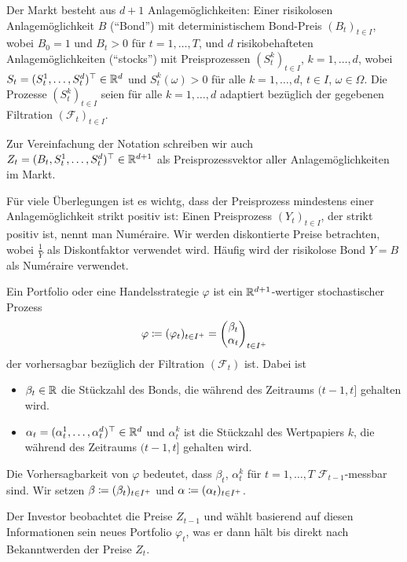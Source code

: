 \documentclass[a4paper,twoside,DIV15,BCOR12mm]{scrbook}
\newcommand{\cF}{\mathcal F}
\begin{document}
Der Markt besteht aus $d+1$ Anlagemöglichkeiten: Einer risikolosen Anlagemöglichkeit $B$ (“Bond”) mit deterministischem Bond-Preis $(B_t)_{t\in I}$, wobei $B_0=1$ und $B_t>0$ für $t=1,\ldots,T$, und $d$ risikobehafteten Anlagemöglichkeiten (“stocks”) mit Preisprozessen $(S_t^k)_{t\in I}$, $k=1,\ldots,d$, wobei $S_t=(S_t^1,\ldots,S_t^d)^\top\in \mathbb{R}^d$ und $S_t^k(\omega)>0$ für alle $k=1,\ldots,d$, $t\in I$, $\omega\in \Omega$. Die Prozesse $(S_t^k)_{t\in I}$ seien für alle $k=1,\ldots,d$ adaptiert bezüglich der gegebenen Filtration $(\cF_t)_{t\in I}$.

Zur Vereinfachung der Notation schreiben wir auch $Z_t = (B_t, S_t^1, \ldots , S_t^d)^\top\in\mathbb{R}^{d+1}$ als Preisprozessvektor aller Anlagemöglichkeiten im Markt.

Für viele Überlegungen ist es wichtg, dass der Preisprozess mindestens einer Anlagemöglichkeit strikt positiv ist:  Einen Preisprozess $(Y_t)_{t\in I}$, der strikt positiv ist, nennt man Numéraire. Wir werden diskontierte Preise betrachten, wobei $\frac 1Y$ als Diskontfaktor verwendet wird. Häufig wird der risikolose Bond $Y=B$ als Numéraire verwendet.

\begin{definition}
Ein Portfolio oder eine Handelsstrategie $\varphi$ ist ein $\mathbb{R}^{d+1}$-wertiger stochastischer Prozess 
\[
\varphi \da (\varphi_t)_{t\in I^+} = 
\begin{pmatrix}
\beta_t \\ \alpha _t
\end{pmatrix}_{t\in I^+}
\]
der vorhersagbar bezüglich der Filtration $(\cF_t)$ ist. Dabei ist
\begin{itemize}
\item $\beta_t\in\mathbb{R}$ die Stückzahl des Bonds, die während des Zeitraums $(t-1,t]$ gehalten wird.
\item $\alpha_t = (\alpha_t^1,\ldots, \alpha_t^d)^\top \in\mathbb{R}^d$ und $\alpha_t^k$ ist die Stückzahl des Wertpapiers $k$, die während des Zeitraums $(t-1,t]$ gehalten wird.
\end{itemize}
Die Vorhersagbarkeit von $\varphi$ bedeutet, dass $\beta_t$, $\alpha_t^k$ für $t=1,\ldots,T$ $\cF_{t-1}$-messbar sind. Wir setzen
$\beta \da (\beta_t)_{t\in I^+}$ und $\alpha \da (\alpha_t)_{t\in I^+}$.
\end{definition}

Der Investor beobachtet die Preise $Z_{t-1}$ und wählt basierend auf diesen Informationen sein neues Portfolio $\varphi_t$, was er dann hält bis direkt nach Bekanntwerden der Preise $Z_t$.
\end{document}
